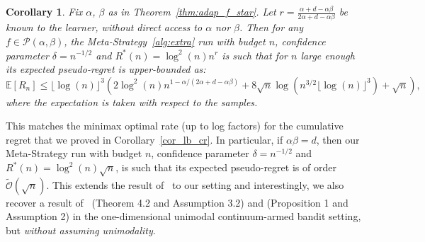\documentclass[final,12pt]{colt2018}
\newtheorem{cor}{Corollary}
\newcommand{\tildeO}[1]{\tilde{\mathcal O}\left( #1 \right)}
\newcommand{\floor}[1]{\lfloor #1 \rfloor}
\begin{document}
\begin{cor}\label{cor:adap_rate}
Fix $\alpha$, $\beta$ as in Theorem~\ref{thm:adap_f_star}. Let $r = \frac{\alpha+d-\alpha\beta}{2\alpha + d - \alpha\beta}$ be known to the learner, without direct access to $\alpha$ nor $\beta$. Then for any $f \in \mathcal P(\alpha,\beta)$, the Meta-Strategy~\ref{alg:extra} run with budget $n$, confidence parameter $\delta = n^{-1/2}$ and $R^*(n) = \log^2(n)n^r$ is such that for $n$ large enough its expected pseudo-regret is upper-bounded as:
$$
\mathbb E[R_n] \leq \floor{\log(n)}^3\left(2\log^2(n)n^{1-\alpha/(2\alpha + d - \alpha\beta)} + 8\sqrt{n}\log\left(n^{3/2}\floor{\log(n)}^3\right) + \sqrt{n}\right),
$$
where the expectation is taken with respect to the samples.
\end{cor}
This matches the minimax optimal rate (up to log factors) for the cumulative regret that we proved in Corollary~\ref{cor_lb_cr}. In particular, if $\alpha\beta = d$, then our Meta-Strategy run with budget $n$, confidence parameter $\delta = n^{-1/2}$ and $R^*(n) = \log^2(n)\sqrt{n}$, is such that its expected pseudo-regret is of order $\tildeO{\sqrt{n}}$. This extends the result of~\cite{bull2015adaptive} to our setting and interestingly, we also recover a result of~\cite{yu2011unimodal} (Theorem 4.2 and Assumption 3.2) and \cite{combes2014unimodal} (Proposition 1 and Assumption 2) in the one-dimensional unimodal continuum-armed bandit setting, but \emph{without assuming unimodality}.
\end{document}
